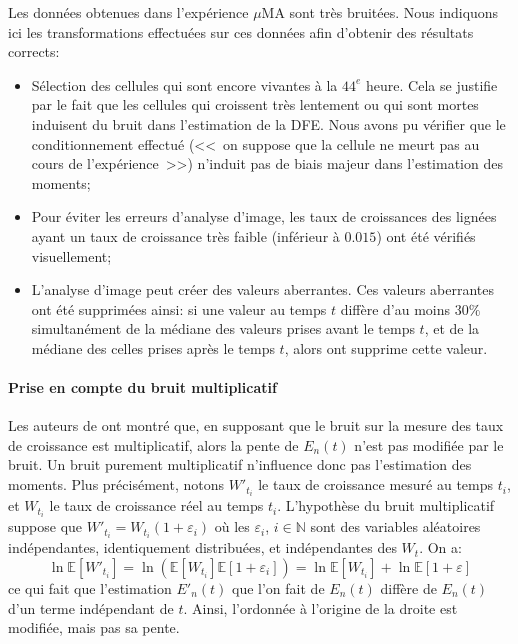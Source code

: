 \documentclass[12pt]{article}
\newcommand{\pth}[1]{\left(#1\right)}
\newcommand{\cro}[1]{\left[#1\right]}
\newcommand{\En}{\mathbb{N}}
\newcommand{\Esp}[1]{\mathbb{E}\cro{#1}}
\begin{document}
Les données obtenues dans l'expérience $\mu$MA sont très bruitées. Nous indiquons ici les transformations effectuées sur ces données afin d'obtenir des résultats corrects:
\begin{itemize}
\item Sélection des cellules qui sont encore vivantes à la $44^e$ heure. Cela se justifie par le fait que les cellules qui croissent très lentement ou qui sont mortes induisent du bruit dans l'estimation de la DFE. Nous avons pu vérifier que le conditionnement effectué (<<~on suppose que la cellule ne meurt pas au cours de l'expérience~>>) n'induit pas de biais majeur dans l'estimation des moments;
\item Pour éviter les erreurs d'analyse d'image, les taux de croissances des lignées ayant un taux de croissance très faible (inférieur à $0.015$) ont été vérifiés visuellement;
\item L'analyse d'image peut créer des valeurs aberrantes. Ces valeurs aberrantes ont été supprimées ainsi: si une valeur au temps $t$ diffère d'au moins $30\%$ simultanément de la médiane des valeurs prises avant le temps $t$, et de la médiane des celles prises après le temps $t$, alors ont supprime cette valeur.
\end{itemize}


\paragraph{Prise en compte du bruit multiplicatif}

Les auteurs de \cite{rob} ont montré que, en supposant que le bruit sur la mesure des taux de croissance est multiplicatif, alors la pente de $E_n(t)$ n'est pas modifiée par le bruit. Un bruit purement multiplicatif n'influence donc pas l'estimation des moments. Plus précisément, notons $W'_{t_i}$ le taux de croissance mesuré au temps $t_i$, et $W_{t_i}$ le taux de croissance réel au temps $t_i$. L'hypothèse du bruit multiplicatif suppose que $W'_{t_i}=W_{t_i}(1+\varepsilon_i)$ où les $\varepsilon_i$, $i\in\En$ sont des variables aléatoires indépendantes, identiquement distribuées, et indépendantes des $W_t$. On a:
\[\ln\Esp{W'_{t_i}}=\ln\pth{\Esp{W_{t_i}}\Esp{1+\varepsilon_i}}=\ln\Esp{W_{t_i}}+\ln\Esp{1+\varepsilon}\]
ce qui fait que l'estimation $E'_n(t)$ que l'on fait de $E_n(t)$ diffère de $E_n(t)$ d'un terme indépendant de $t$. Ainsi, l'ordonnée à l'origine de la droite est modifiée, mais pas sa pente.



\FloatBarrier
\end{document}
